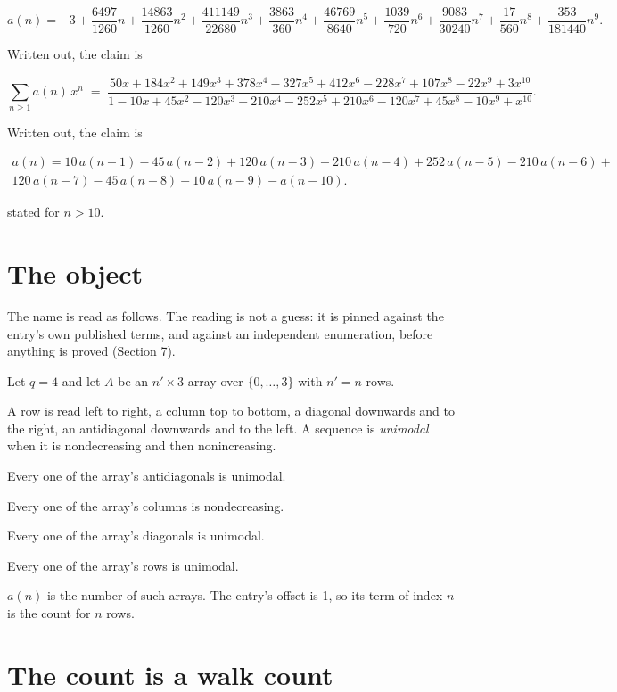 \documentclass[11pt]{article}
\theoremstyle{definition}
\begin{document}
\[a(n) = -3 + \frac{6497}{1260}n + \frac{14863}{1260}n^{2} + \frac{411149}{22680}n^{3} + \frac{3863}{360}n^{4} + \frac{46769}{8640}n^{5} + \frac{1039}{720}n^{6} + \frac{9083}{30240}n^{7} + \frac{17}{560}n^{8} + \frac{353}{181440}n^{9}.\]

Written out, the claim is

\[\sum_{n \ge 1} a(n)\,x^n \;=\; \frac{50x + 184x^{2} + 149x^{3} + 378x^{4} - 327x^{5} + 412x^{6} - 228x^{7} + 107x^{8} - 22x^{9} + 3x^{10}}{1 - 10x + 45x^{2} - 120x^{3} + 210x^{4} - 252x^{5} + 210x^{6} - 120x^{7} + 45x^{8} - 10x^{9} + x^{10}}.\]

Written out, the claim is

\begin{multline*} a(n) = 10\,a(n-1) - 45\,a(n-2) + 120\,a(n-3) - 210\,a(n-4) + 252\,a(n-5) - 210\,a(n-6) + \\ 120\,a(n-7) - 45\,a(n-8) + 10\,a(n-9) - a(n-10). \end{multline*}

stated for $n > 10$.

\section{The object}

The name is read as follows. The reading is not a guess: it is pinned against the entry's own published terms, and against an independent enumeration, before anything is proved (Section 7).

Let $q = 4$ and let $A$ be an $n' \times 3$ array over $\{0,\dots,3\}$ with $n' = n$ rows.

A row is read left to right, a column top to bottom, a diagonal downwards and to the right, an antidiagonal downwards and to the left. A sequence is {\itshape unimodal} when it is nondecreasing and then nonincreasing.

Every one of the array's antidiagonals is unimodal.

Every one of the array's columns is nondecreasing.

Every one of the array's diagonals is unimodal.

Every one of the array's rows is unimodal.

$a(n)$ is the number of such arrays. The entry's offset is 1, so its term of index $n$ is the count for $n$ rows.

\section{The count is a walk count}
\end{document}
